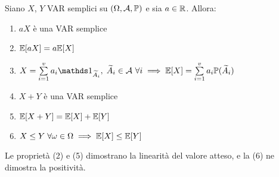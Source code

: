 \begin{propb}\label{prop-valore-atteso-semplici}
  Siano $X$, $Y$ VAR semplici su $(\Omega, \mathcal A, \mathbb P)$ e sia $a \in \mathbb R$. Allora:
  \begin{enumerate}
    \item $aX$ è una VAR semplice
    \item $\mathbb E[aX] = a \mathbb E[X]$
    \item $X = \sum\limits_{i=1}^{v} a_i \Ind_{\widetilde A_i}, \; \widetilde A_i \in \Ac \ \forall i
      \implies \EE[X] = \sum\limits_{i=1}^{v} a_i \PP(\widetilde A_i)$
    \item $X + Y$ è una VAR semplice
    \item $\mathbb E[X+Y] = \mathbb E[X] + \mathbb E[Y]$
    \item $X \leq Y \; \forall \omega \in \Omega \implies \mathbb E[X] \leq \mathbb E[Y]$
  \end{enumerate}
\end{propb}
Le proprietà (2) e (5) dimostrano la linearità del valore atteso, e la (6) ne dimostra la positività.

